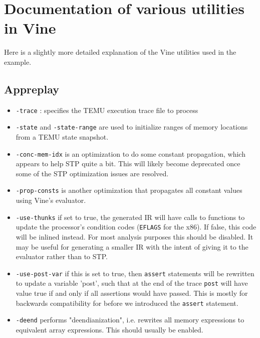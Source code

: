 \section {Documentation of various utilities in Vine}
\label{sec:utils}

Here is a slightly more detailed explanation of the Vine utilities
used in the example.

\subsection {Appreplay}

\begin{itemize}

\item \texttt{-trace} : specifies the TEMU execution trace file to process

\item \texttt {-state} and \texttt{-state-range} are used to
initialize ranges of memory locations from a TEMU state snapshot.

\item \texttt{-conc-mem-idx} is an optimization to do some constant
propagation, which appears to help STP quite a bit. This will likely
become deprecated once some of the STP optimization issues are
resolved.

\item \texttt{-prop-consts} is another optimization that propagates
all constant values using Vine's evaluator.

\item \texttt {-use-thunks} if set to true, the generated IR will
have calls to functions to update the processor's condition codes
(\verb'EFLAGS' for the x86). If false, this code will be inlined
instead.  For most analysis purposes this should be disabled. It may
be useful for generating a smaller IR with the intent of giving it to
the evaluator rather than to STP.

\item \texttt{-use-post-var} if this is  set to true, then
\verb'assert' statements will be rewritten to update a variable
'post', such that at the end of the trace \verb'post' will have value
true if and only if all assertions would have passed.  This is mostly
for backwards compatibility for before we introduced the \verb'assert'
statement.

\item \texttt  {-deend} performs "deendianization",  i.e. rewrites
all memory expressions to equivalent array expressions. This should
usually be enabled.


\end{itemize}
